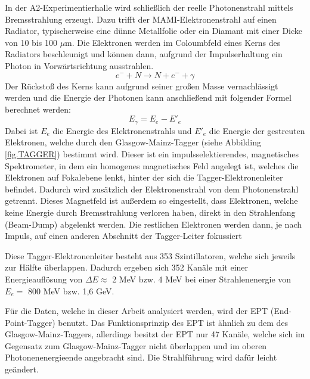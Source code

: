 \documentclass[a4paper,11pt,oneside,final,german,openbib,pdftex]{scrbook}
\begin{document}
{ In der A2-Experimentierhalle wird schlie{\ss}lich der reelle Photonenstrahl mittels Bremsstrahlung erzeugt. Dazu trifft der MAMI-Elektronenstrahl auf einen Radiator, typischerweise eine d\"unne Metallfolie oder ein Diamant mit einer Dicke von 10 bis 100 $\mu$m. Die Elektronen werden im Coloumbfeld eines Kerns des Radiators beschleunigt und k\"onnen dann, aufgrund der Impulserhaltung ein Photon in Vorw\"artsrichtung ausstrahlen.
 \begin{equation}
 e^{-}+N\rightarrow N + e^{-}+\gamma
 \label{eq.Streuung}
 \end{equation}
  Der R\"ucksto{\ss} des Kerns kann aufgrund seiner gro{\ss}en Masse vernachl\"assigt werden und die Energie der Photonen kann anschlie{\ss}end mit folgender Formel berechnet werden:
  \begin{equation}
  E_{\gamma}= E_{e^{}}-E{'}_{e}
  \label{eq.Photonenenergie}
  \end{equation}
 Dabei ist $E_e$ die Energie des Elektronenstrahls und $E'_{e}$ die Energie der gestreuten Elektronen, welche durch den Glasgow-Mainz-Tagger (siehe Abbilding \ref{fig.TAGGER}) bestimmt wird.
 Dieser ist ein impulsselektierendes, magnetisches Spektrometer, in dem ein homogenes magnetisches Feld angelegt ist, welches die Elektronen auf Fokalebene lenkt, hinter der sich die Tagger-Elektronenleiter befindet. Dadurch wird zus\"atzlich der Elektronenstrahl von dem Photonenstrahl getrennt. Dieses Magnetfeld ist außerdem so eingestellt, dass Elektronen, welche keine Energie durch Bremsstrahlung verloren haben, direkt in den Strahlenfang (Beam-Dump) abgelenkt werden. Die restlichen Elektronen werden dann, je nach Impuls, auf einen anderen Abschnitt der Tagger-Leiter fokussiert
 
 Diese Tagger-Elektronenleiter besteht aus 353 Szintillatoren, welche sich jeweils zur H\"alfte \"uberlappen.
 Dadurch ergeben sich 352 Kan\"ale mit einer Energieaufl\"osung von $\Delta E \approx$  2 MeV bzw. 4 MeV bei einer Strahlenenergie von $E_e=$ 800 MeV bzw. 1,6 GeV. 
 
 F\"ur die Daten, welche in dieser Arbeit analysiert werden, wird der EPT (End-Point-Tagger) benutzt. Das Funktionsprinzip des EPT ist \"ahnlich zu dem des Glasgow-Mainz-Taggers, allerdings besitzt der EPT nur 47 Kan\"ale, welche sich im Gegensatz zum Glasgow-Mainz-Tagger nicht \"uberlappen und im oberen Photonenenergieende angebracht sind. Die Strahlf\"uhrung wird daf\"ur leicht ge\"andert.
 
}
\end{document}
